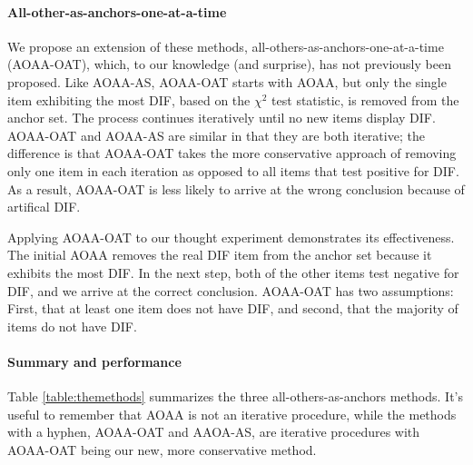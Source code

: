 \documentclass[
  11pt,
]{article}
\begin{document}
\hypertarget{all-other-as-anchors-one-at-a-time}{%
\paragraph{All-other-as-anchors-one-at-a-time}\label{all-other-as-anchors-one-at-a-time}}

We propose an extension of these methods, all-others-as-anchors-one-at-a-time (AOAA-OAT), which, to our knowledge (and surprise), has not previously been proposed. Like AOAA-AS, AOAA-OAT starts with AOAA, but only the single item exhibiting the most DIF, based on the \(\chi^2\) test statistic, is removed from the anchor set. The process continues iteratively until no new items display DIF. AOAA-OAT and AOAA-AS are similar in that they are both iterative; the difference is that AOAA-OAT takes the more conservative approach of removing only one item in each iteration as opposed to all items that test positive for DIF. As a result, AOAA-OAT is less likely to arrive at the wrong conclusion because of artifical DIF.

Applying AOAA-OAT to our thought experiment demonstrates its effectiveness. The initial AOAA removes the real DIF item from the anchor set because it exhibits the most DIF. In the next step, both of the other items test negative for DIF, and we arrive at the correct conclusion. AOAA-OAT has two assumptions: First, that at least one item does not have DIF, and second, that the majority of items do not have DIF.

\hypertarget{summary-and-performance}{%
\paragraph{Summary and performance}\label{summary-and-performance}}

Table \ref{table:themethods} summarizes the three all-others-as-anchors methods. It's useful to remember that AOAA is not an iterative procedure, while the methods with a hyphen, AOAA-OAT and AAOA-AS, are iterative procedures with AOAA-OAT being our new, more conservative method.
\end{document}
